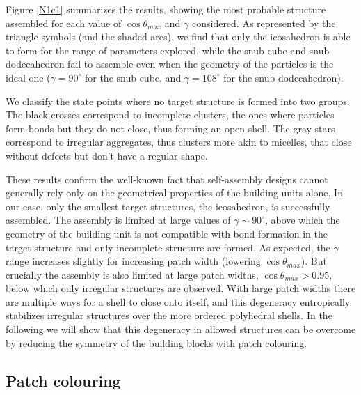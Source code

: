 \documentclass[a4paper, amsfonts, amssymb, amsmath, reprint, showkeys, nofootinbib, twoside]{revtex4-1}
\begin{document}
Figure \ref{N1c1} summarizes the results, showing the most probable structure assembled for each value of $\cos\theta_{max}$ and $\gamma$ considered. As represented by the triangle symbols (and the shaded ares), we find that only the icosahedron is able to form for the range of parameters explored, while the snub cube and snub dodecahedron fail to assemble even when the geometry of the particles is the ideal one ($\gamma=90^\circ$ for the snub cube, and  $\gamma=108^\circ$ for the snub dodecahedron).

We classify the state points where no target structure is formed into two groups. The black crosses correspond to incomplete clusters, the ones where particles form bonds but they do not close, thus forming an open shell. The gray stars correspond to irregular aggregates, thus clusters more akin to micelles, that close without defects but don't have a regular shape.

These results confirm the well-known fact that self-assembly designs cannot generally rely only on the geometrical properties of the building units alone. In our case, only the smallest target structures, the icosahedron, is successfully assembled. The assembly is limited at large values of $\gamma\sim 90^\circ$, above which the geometry of the building unit is not compatible with bond formation in the target structure and only incomplete structure are formed. As expected, the $\gamma$ range increases slightly for increasing patch width (lowering $\cos\theta_{max}$). But crucially the assembly is also limited at large patch widths, $\cos\theta_{max}>0.95$, below which only irregular structures are observed. With large patch widths there are multiple ways for a shell to close onto itself, and this degeneracy entropically stabilizes irregular structures over the more ordered polyhedral shells. In the following we will show that this degeneracy in allowed structures can be overcome by reducing the symmetry of the building blocks with patch colouring.



\subsection{Patch colouring}
\end{document}
